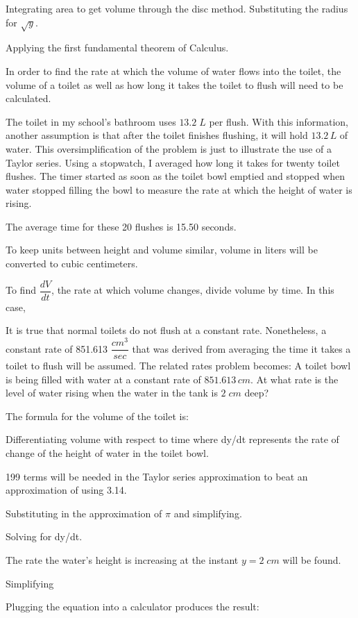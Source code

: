 Integrating area to get volume through the disc method.
Substituting the radius for \(\sqrt{y}\).

Applying the first fundamental theorem of Calculus.

In order to find the rate at which the volume of water flows into the toilet, the volume of a toilet as well as how long it takes the toilet to flush will need to be calculated. 

The toilet in my school's bathroom uses \(13.2 \; L\) per flush. With this information, another assumption is that after the toilet finishes flushing, it will hold \(13.2 \, L\) of water. This oversimplification of the problem is just to illustrate the use of a Taylor series. Using a stopwatch, I averaged how long it takes for twenty toilet flushes. The timer started as soon as the toilet bowl emptied and stopped when water stopped filling the bowl to measure the rate at which the height of water is rising.


The average time for these 20 flushes is 15.50 seconds. 

To keep units between height and volume similar, volume in liters will be converted to cubic centimeters.

To find \(\dfrac{dV}{dt}\), the rate at which volume changes, divide volume by time. In this case,

It is true that normal toilets do not flush at a constant rate. Nonetheless,  a constant rate of 851.613 \(\dfrac{cm^{3}}{sec}\) that was derived from averaging the time it takes a toilet to flush will be assumed. The related rates problem becomes: A toilet bowl is being filled with water at a constant rate of \(851.613 \, cm\). At what rate is the level of water rising when the water in the tank is \(2 \; cm\) deep?

The formula for the volume of the toilet is:

Differentiating volume with respect to time where dy/dt represents the rate of change of the height of water in the toilet bowl.

199 terms will be needed in the Taylor series approximation to beat an approximation of using 3.14.


Substituting in the approximation of \(\pi\) and simplifying.


Solving for dy/dt.

The rate the water's height is increasing at the instant \(y = 2 \; cm\) will be found.

Simplifying

Plugging the equation into a calculator produces the result:


